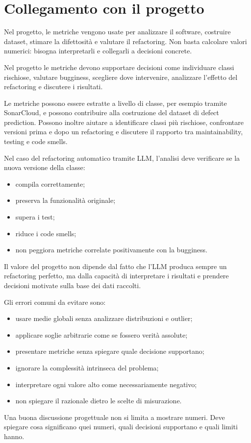 \section{Collegamento con il progetto}

Nel progetto, le metriche vengono usate per analizzare il software, costruire dataset, stimare la difettosità e valutare il refactoring. Non basta calcolare valori numerici: bisogna interpretarli e collegarli a decisioni concrete.

\begin{notaesame}
Nel progetto le metriche devono supportare decisioni come individuare classi rischiose, valutare bugginess, scegliere dove intervenire, analizzare l'effetto del refactoring e discutere i risultati.
\end{notaesame}

Le metriche possono essere estratte a livello di classe, per esempio tramite SonarCloud, e possono contribuire alla costruzione del dataset di defect prediction. Possono inoltre aiutare a identificare classi più rischiose, confrontare versioni prima e dopo un refactoring e discutere il rapporto tra maintainability, testing e code smells.

Nel caso del refactoring automatico tramite LLM, l'analisi deve verificare se la nuova versione della classe:

\begin{itemize}
    \item compila correttamente;
    \item preserva la funzionalità originale;
    \item supera i test;
    \item riduce i code smells;
    \item non peggiora metriche correlate positivamente con la bugginess.
\end{itemize}

\begin{notaprof}
Il valore del progetto non dipende dal fatto che l'LLM produca sempre un refactoring perfetto, ma dalla capacità di interpretare i risultati e prendere decisioni motivate sulla base dei dati raccolti.
\end{notaprof}

Gli errori comuni da evitare sono:

\begin{itemize}
    \item usare medie globali senza analizzare distribuzioni e outlier;
    \item applicare soglie arbitrarie come se fossero verità assolute;
    \item presentare metriche senza spiegare quale decisione supportano;
    \item ignorare la complessità intrinseca del problema;
    \item interpretare ogni valore alto come necessariamente negativo;
    \item non spiegare il razionale dietro le scelte di misurazione.
\end{itemize}

\begin{notaesame}
Una buona discussione progettuale non si limita a mostrare numeri. Deve spiegare cosa significano quei numeri, quali decisioni supportano e quali limiti hanno.
\end{notaesame}